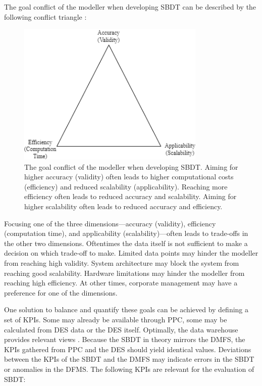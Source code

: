 The goal conflict of the modeller when developing SBDT can be described by the following conflict triangle \autocite{robinson2014simulation,balci2012life}:

\begin{figure}[htbp]
  \centering
  \includegraphics[width=0.8\textwidth]{figures/goals.png}
  \caption{The goal conflict of the modeller when developing SBDT. Aiming for higher accuracy (validity) often leads to higher computational costs (efficiency) and reduced scalability (applicability). Reaching more efficiency often leads to reduced accuracy and scalability. Aiming for higher scalability often leads to reduced accuracy and efficiency.}
  \label{fig:goals}
\end{figure}

Focusing one of the three dimensions—accuracy (validity), efficiency (computation time), and applicability (scalability)—often leads to trade-offs in the other two dimensions. Oftentimes the data itself is not sufficient to make a decision on which trade-off to make. Limited data points may hinder the modeller from reaching high validity. System architecture may block the system from reaching good scalability. Hardware limitations may hinder the modeller from reaching high efficiency.
At other times, corporate management may have a preference for one of the dimensions.

One solution to balance and quantify these goals can be achieved by defining a set of KPIs. Some may already be available through PPC, some may be calculated from DES data or the DES itself. Optimally, the data warehouse provides relevant views \autocite{cui2020manufacturing}. Because the SBDT in theory mirrors the DMFS, the KPIs gathered from PPC and the DES should yield identical values. Deviations between the KPIs of the SBDT and the DMFS may indicate errors in the SBDT or anomalies in the DFMS. The following KPIs are relevant for the evaluation of SBDT:

